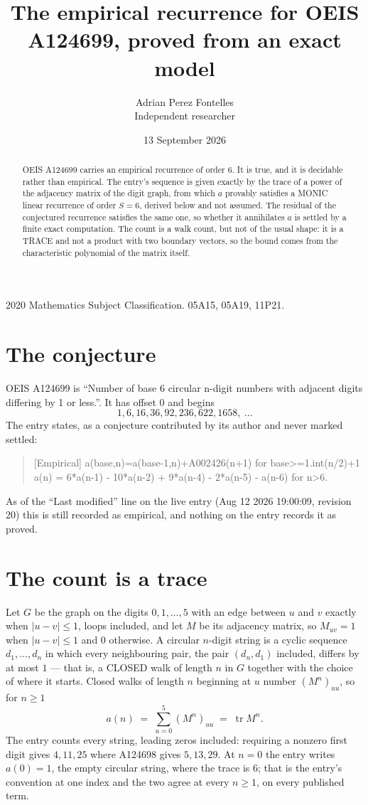 \documentclass[11pt,a4paper]{article}
\title{The empirical recurrence for OEIS A124699, proved from an exact model}
\author{Adrian Perez Fontelles\\ \small Independent researcher}
\date{13 September 2026}
\theoremstyle{plain}
\theoremstyle{definition}
\begin{document}
\maketitle

\begin{abstract}
OEIS A124699 carries an empirical recurrence of order $6$. It is true, and it is
decidable rather than empirical. The entry's sequence is given exactly by the trace of a power of the adjacency matrix of the digit graph, from
which $a$ provably satisfies a MONIC linear recurrence of order $S=6$, derived below and not
assumed. The residual of the conjectured recurrence satisfies the same one, so whether it
annihilates $a$ is settled by a finite exact computation. The count is a walk count, but not of the usual shape: it is a TRACE and not a product with two boundary vectors, so the bound comes from the characteristic polynomial of the matrix itself.
\end{abstract}

\noindent\small 2020 Mathematics Subject Classification. 05A15, 05A19, 11P21.\normalsize

\section{The conjecture}

OEIS A124699 is ``Number of base 6 circular n-digit numbers with adjacent digits differing by 1 or less.''. It has offset $0$ and begins
\[
1, 6, 16, 36, 92, 236, 622, 1658,\ \dots
\]
The entry states, as a conjecture contributed by its author and never marked settled:
\begin{quote}
[Empirical] a(base,n)=a(base-1,n)+A002426(n+1) for base>=1.int(n/2)+1 a(n) = 6*a(n-1) - 10*a(n-2) + 9*a(n-4) - 2*a(n-5) - a(n-6) for n>6.
\end{quote}
As of the ``Last modified'' line on the live entry (Aug 12 2026 19:00:09, revision 20)
this is still recorded as empirical, and nothing on the entry records it as proved.

\section{The count is a trace}

Let $G$ be the graph on the digits $0,1,\dots,5$ with an edge between $u$ and $v$ exactly
when $|u-v|\le1$, loops included, and let $M$ be its adjacency matrix, so $M_{uv}=1$ when
$|u-v|\le1$ and $0$ otherwise. A circular $n$-digit string is a cyclic sequence
$d_1,\dots,d_n$ in which every neighbouring pair, the pair $(d_n,d_1)$ included, differs by at
most $1$ --- that is, a CLOSED walk of length $n$ in $G$ together with the choice of where it
starts. Closed walks of length $n$ beginning at $u$ number $(M^n)_{uu}$, so for $n\ge1$
\[
a(n)\;=\;\sum_{u=0}^{5}(M^{n})_{uu}\;=\;\operatorname{tr}M^{n} .
\]
The entry counts every string, leading zeros included: requiring a nonzero first digit gives
$4,11,25$ where A124698 gives $5,13,29$. At $n=0$ the entry writes $a(0)=1$, the empty circular
string, where the trace is $6$; that is the entry's convention at one index and the two agree
at every $n\ge1$, on every published term.
\end{document}
